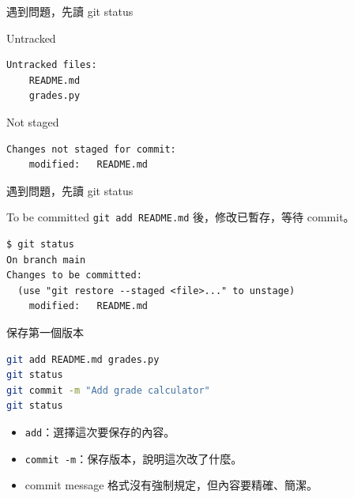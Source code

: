 \documentclass[xetex, unicode, 10pt, aspectratio=169]{beamer}
\begin{document}
\begin{frame}[fragile]{遇到問題，先讀 git status}
    \begin{block}{Untracked}
\begin{lstlisting}[basicstyle=\ttfamily\footnotesize,columns=fullflexible,lineskip=-1pt]
Untracked files:
    README.md
    grades.py
\end{lstlisting}
    \end{block}
    \begin{block}{Not staged}
\begin{lstlisting}[basicstyle=\ttfamily\footnotesize,columns=fullflexible,lineskip=-1pt]
Changes not staged for commit:
    modified:   README.md
\end{lstlisting}
    \end{block}
\end{frame}


\begin{frame}[fragile]{遇到問題，先讀 git status}
\begin{block}{To be committed}
        \texttt{git add README.md} 後，修改已暫存，等待 commit。
\begin{lstlisting}[basicstyle=\ttfamily\footnotesize,columns=fullflexible,lineskip=-1pt]
$ git status
On branch main
Changes to be committed:
  (use "git restore --staged <file>..." to unstage)
    modified:   README.md
\end{lstlisting}
    \end{block}
\end{frame}

\begin{frame}[fragile]{保存第一個版本}
\begin{lstlisting}[language=bash]
git add README.md grades.py
git status
git commit -m "Add grade calculator"
git status
\end{lstlisting}
    \begin{itemize}
        \item \texttt{add}：選擇這次要保存的內容。
        \item \texttt{commit -m}：保存版本，說明這次改了什麼。
        \item commit message 格式沒有強制規定，但內容要精確、簡潔。
    \end{itemize}
\end{frame}
\end{document}
